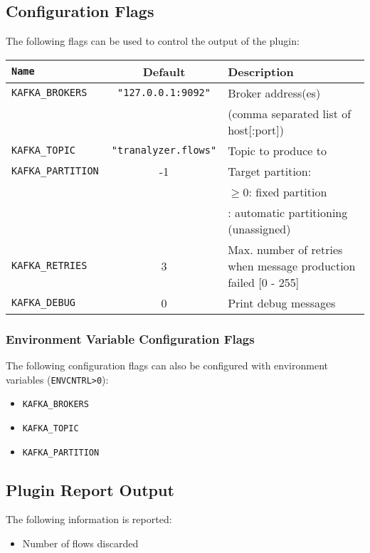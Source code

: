 \documentclass[documentation]{subfiles}
\begin{document}
\subsection{Configuration Flags}
The following flags can be used to control the output of the plugin:
\begin{longtable}{>{\tt}lcl}
    \toprule
    {\bf Name} & {\bf Default} & {\bf Description}\\
    \midrule\endhead%
    KAFKA\_BROKERS   & {\tt\small "127.0.0.1:9092"}   & Broker address(es)                                              \\
                     &                                & (comma separated list of host[:port])                           \\
    KAFKA\_TOPIC     & {\tt\small "tranalyzer.flows"} & Topic to produce to                                             \\
    KAFKA\_PARTITION & -1                             & Target partition:                                               \\
                     &                                & \qquad $\geq 0$: fixed partition                                \\
                     &                                & \qquad -1: automatic partitioning (unassigned)                  \\
    KAFKA\_RETRIES   & 3                              & Max. number of retries when message production failed [0 - 255] \\
    KAFKA\_DEBUG     & 0                              & Print debug messages                                            \\
    \bottomrule
\end{longtable}

\subsubsection{Environment Variable Configuration Flags}
The following configuration flags can also be configured with environment variables ({\tt ENVCNTRL>0}):
\begin{itemize}
    \item {\tt KAFKA\_BROKERS}
    \item {\tt KAFKA\_TOPIC}
    \item {\tt KAFKA\_PARTITION}
\end{itemize}

\subsection{Plugin Report Output}
The following information is reported:
\begin{itemize}
    \item Number of flows discarded
\end{itemize}
\end{document}
